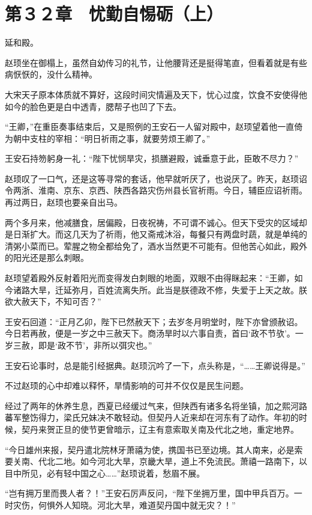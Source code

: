 \section{第３２章　忧勤自惕砺（上）}

延和殿。

赵顼坐在御榻上，虽然自幼传习的礼节，让他腰背还是挺得笔直，但看着就是有些病恹恹的，没什么精神。

大宋天子原本体质就不算好，这段时间灾情遍及天下，忧心过度，饮食不安使得他如今的脸色更是白中透青，腮帮子也凹了下去。

“王卿，”在重臣奏事结束后，又是照例的王安石一人留对殿中，赵顼望着他一直倚为朝中支柱的宰相：“明日祈雨之事，就要劳烦王卿了。”

王安石持笏躬身一礼：“陛下忧悯旱灾，损膳避殿，诚垂意于此，臣敢不尽力？”

赵顼叹了一口气，还是这等寻常的套话，他早就听厌了，也说厌了。昨天，赵顼诏令两浙、淮南、京东、京西、陕西各路灾伤州县长官祈雨。今日，辅臣应诏祈雨。再过两日，赵顼也要亲自出马。

两个多月来，他减膳食，居偏殿，日夜祝祷，不可谓不诚心。但天下受灾的区域却是日渐扩大。而这几天为了祈雨，他又斋戒沐浴，每餐只有两盘时蔬，就是单纯的清粥小菜而已。荤腥之物全都给免了，酒水当然更不可能有。但他苦心如此，殿外的阳光还是那么刺眼。

赵顼望着殿外反射着阳光而变得发白刺眼的地面，双眼不由得眯起来：“王卿，如今诸路大旱，迁延弥月，百姓流离失所。此当是朕德政不修，失爱于上天之故。朕欲大赦天下，不知可否？”

王安石回道：“正月乙卯，陛下已然赦天下；去岁冬月明堂时，陛下亦曾颁赦诏。今日若再赦，便是一岁之中三赦天下。商汤旱时以六事自责，首曰‘政不节欤’。一岁三赦，即是‘政不节’，非所以弭灾也。”

王安石论事时，总是能引经据典。赵顼沉吟了一下，点头称是，“……王卿说得是。”

不过赵顼的心中却难以释怀，旱情影响的可并不仅仅是民生问题。

经过了两年的休养生息，西夏已经缓过气来，但陕西有诸多名将坐镇，加之熙河路蕃军整饬得力，梁氏兄妹决不敢轻动。但契丹人近来却在河东有了动作。年初的时候，契丹来贺正旦的使节更曾暗示，辽主有意索取关南及代北之地，重定地界。

“今日雄州来报，契丹遣北院林牙萧禧为使，携国书已至边境。其人南来，必是索要关南、代北二地。如今河北大旱，京畿大旱，道上不免流民。萧禧一路南下，以目中所见，必有轻中国之心……”赵顼说着，愁眉不展。

“岂有拥万里而畏人者？！”王安石厉声反问，“陛下坐拥万里，国中甲兵百万。一时灾伤，何惧外人知晓。河北大旱，难道契丹国中就无灾？！”

